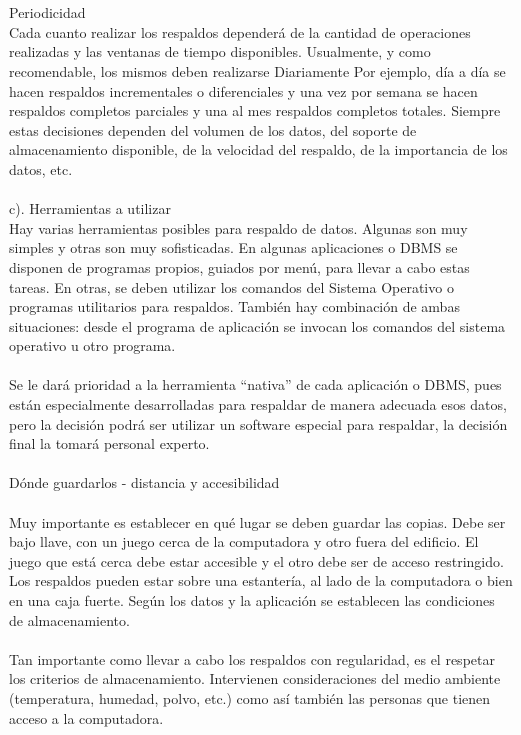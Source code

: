 \begin{enumerate}[3.1.]
\\
\\Periodicidad 
\\Cada cuanto realizar los respaldos dependerá de la cantidad de operaciones realizadas y las ventanas de tiempo disponibles. Usualmente, y como recomendable, los mismos deben realizarse Diariamente Por ejemplo, día a día se hacen respaldos incrementales o diferenciales y una vez por semana se hacen respaldos completos parciales y una al mes respaldos completos totales. Siempre estas decisiones dependen del volumen de los datos, del soporte de almacenamiento disponible, de la velocidad del respaldo, de la importancia de los datos, etc. 
\\
\\c). Herramientas a utilizar 
\\     Hay varias herramientas posibles para respaldo de datos. Algunas son muy simples y otras son muy sofisticadas. En algunas aplicaciones o DBMS se disponen de programas propios, guiados por menú, para llevar a cabo estas tareas. En otras, se deben utilizar los comandos del Sistema Operativo o programas utilitarios para respaldos. También hay combinación de ambas situaciones: desde el programa de aplicación se invocan los comandos del sistema operativo u otro programa. 
\\ 
\\     Se le dará prioridad a la herramienta “nativa” de cada aplicación o DBMS, pues están especialmente desarrolladas para respaldar de manera adecuada esos datos, pero la decisión podrá ser utilizar un software especial para respaldar, la decisión final la tomará personal experto. 
\\
\\     Dónde guardarlos - distancia y accesibilidad  
\\
\\Muy importante es establecer en qué lugar se deben guardar las copias. Debe ser bajo llave, con un juego cerca de la computadora y otro fuera del edificio. El juego que está cerca debe estar accesible y el otro debe ser de acceso restringido. Los respaldos pueden estar sobre una estantería, al lado de la computadora o bien en una caja fuerte. Según los datos y la aplicación se establecen las condiciones de almacenamiento. 
\\
\\Tan importante como llevar a cabo los respaldos con regularidad, es el respetar los criterios de almacenamiento. Intervienen consideraciones del medio ambiente (temperatura, humedad, polvo, etc.) como así también las personas que tienen acceso a la computadora. 

\end{enumerate}
